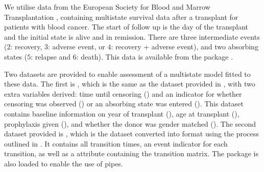 \documentclass[nojss]{jss}
\begin{document}
We utilise data from the European Society for Blood and Marrow Transplantation \citep{EBMT2023}, containing multistate survival data after a transplant for patients with blood cancer. The start of follow up is the day of the transplant and the initial state is alive and in remission. There are three intermediate events ($2$: recovery, $3$: adverse event, or $4$: recovery + adverse event), and two absorbing states ($5$: relapse and $6$: death). This data is available from the  package \citep{DeWreede2011}.

Two datasets are provided to enable assessment of a multistate model fitted to these data. The first is , which is the same as the  dataset provided in , with two extra variables derived: time until censoring () and an indicator for whether censoring was observed () or an absorbing state was entered (). This dataset contains baseline information on year of transplant (), age at transplant (), prophylaxis given (), and whether the donor was gender matched (). The second dataset provided is , which is the  dataset converted into  format using the process outlined in \cite{DeWreede2011}. It contains all transition times, an event indicator for each transition, as well as a  attribute containing the transition matrix. The package  is also loaded to enable the use of pipes.
\end{document}
